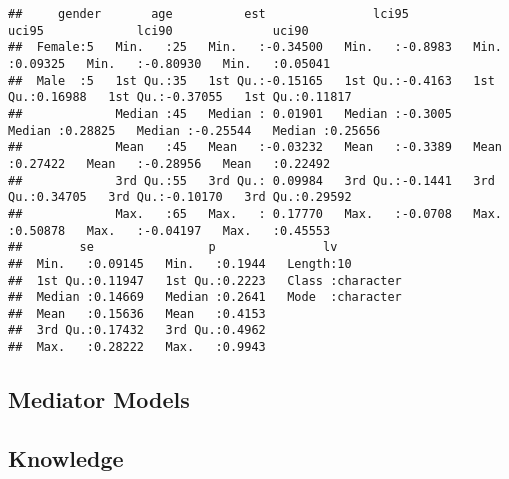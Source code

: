 \documentclass[
]{article}
\begin{document}
\begin{verbatim}
##     gender       age          est               lci95             uci95             lci90              uci90        
##  Female:5   Min.   :25   Min.   :-0.34500   Min.   :-0.8983   Min.   :0.09325   Min.   :-0.80930   Min.   :0.05041  
##  Male  :5   1st Qu.:35   1st Qu.:-0.15165   1st Qu.:-0.4163   1st Qu.:0.16988   1st Qu.:-0.37055   1st Qu.:0.11817  
##             Median :45   Median : 0.01901   Median :-0.3005   Median :0.28825   Median :-0.25544   Median :0.25656  
##             Mean   :45   Mean   :-0.03232   Mean   :-0.3389   Mean   :0.27422   Mean   :-0.28956   Mean   :0.22492  
##             3rd Qu.:55   3rd Qu.: 0.09984   3rd Qu.:-0.1441   3rd Qu.:0.34705   3rd Qu.:-0.10170   3rd Qu.:0.29592  
##             Max.   :65   Max.   : 0.17770   Max.   :-0.0708   Max.   :0.50878   Max.   :-0.04197   Max.   :0.45553  
##        se                p               lv           
##  Min.   :0.09145   Min.   :0.1944   Length:10         
##  1st Qu.:0.11947   1st Qu.:0.2223   Class :character  
##  Median :0.14669   Median :0.2641   Mode  :character  
##  Mean   :0.15636   Mean   :0.4153                     
##  3rd Qu.:0.17432   3rd Qu.:0.4962                     
##  Max.   :0.28222   Max.   :0.9943
\end{verbatim}

\hypertarget{mediator-models-1}{%
\subsection{Mediator Models}\label{mediator-models-1}}

\hypertarget{knowledge-1}{%
\subsection{Knowledge}\label{knowledge-1}}
\end{document}
